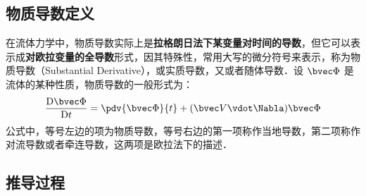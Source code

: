 
\begin{issues}
\issueDraft
\end{issues}

\subsection{物质导数定义}

在流体力学中，物质导数实际上是\textbf{拉格朗日法下某变量对时间的导数}，但它可以表示成\textbf{对欧拉变量的全导数}形式，因其特殊性，常用大写的微分符号来表示，称为物质导数（Substantial  Derivative），或实质导数，又或者随体导数．设 $\bvec \Phi$ 是流体的某种性质，物质导数的一般形式为：
\begin{align}
\frac{\mathrm{D}\bvec \Phi }{\mathrm{D} t}=\pdv{\bvec \Phi}{t}+(\bvec V \vdot \Nabla)\bvec \Phi
\end{align}
公式中，等号左边的项为物质导数，等号右边的第一项称作当地导数，第二项称作对流导数或者牵连导数，这两项是欧拉法下的描述．

\subsection{推导过程}

